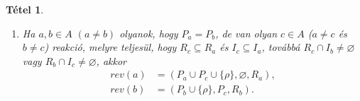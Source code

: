 \documentclass[12pt]{article}
\theoremstyle{definition}
\theoremstyle{remark}
\theoremstyle{plain}
\newtheorem*{theorem*}{Tétel}
\let\emptyset\varnothing
\begin{document}
\begin{theorem*}
\begin{enumerate}[label={(\arabic*)}]
            \item
            Ha $a, b \in A$ $(a \neq b)$ olyanok, hogy $P_{a} = P_{b}$, de van olyan $c \in A$ ($a \neq c$ és $b \neq c$) reakció, melyre teljesül, hogy $R_{c} \subseteq R_{a}$ és $I_{c} \subseteq I_{a}$, továbbá $R_{c} \cap I_{b} \neq \emptyset$ vagy $R_{b} \cap I_{c} \neq \emptyset$, akkor
            \begin{align*}
                \textit{rev}(a) &= (P_{a} \cup P_{c} \cup \{ \rho \}, \emptyset, R_{a}), \\
                \textit{rev}(b) &= (P_{b} \cup \{ \rho \}, P_{c}, R_{b}).
            \end{align*}
        \end{enumerate}
    \end{theorem*}
\end{document}
